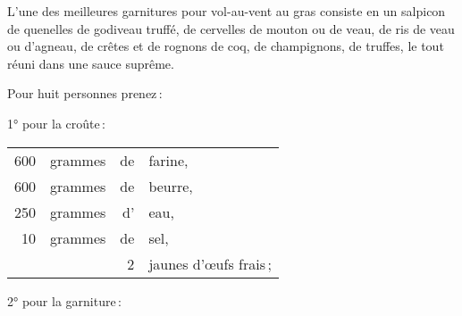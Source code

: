 L'une des meilleures garnitures pour vol-au-vent au gras consiste en un
salpicon de quenelles de godiveau truffé, de cervelles de mouton ou de veau, de
ris de veau ou d'agneau, de crêtes et de rognons de coq, de champignons, de
truffes, le tout réuni dans une sauce suprême.

\clearpage

Pour huit personnes prenez :

\medskip

1° pour la croûte :

\medskip

\footnotesize
\begin{longtable}{rrrp{16em}}
    600 & grammes & de & farine,                                                                          \\
    600 & grammes & de & beurre,                                                                          \\
    250 & grammes & d' & eau,                                                                             \\
     10 & grammes & de & sel,                                                                             \\
        &         &  2 & jaunes d'œufs frais ;                                                            \\
\end{longtable}
\normalsize

2° pour la garniture :

\medskip

